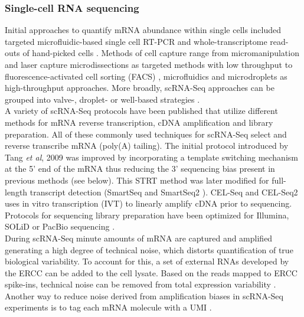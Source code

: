 \subsubsection{Single-cell RNA sequencing}

Initial approaches to quantify mRNA abundance within single cells included targeted microfluidic-based single cell RT-PCR \citep{Warren2006} and whole-transcriptome read-outs of hand-picked cells \citep{Tang2009}. Methods of cell capture range from micromanipulation \citep{Grindberg2014} and laser capture microdissections \citep{Frumkin2008} as targeted methods with low throughput to  fluorescence-activated cell sorting (FACS) \citep{Hayashi2010, Dalerba2011, Jaitin2014}, microfluidics \citep{Trapnell2014, Treutlein2014} and microdroplets \citep{Klein2015, Macosko2015} as high-throughput approaches. More broadly, \gls{scRNA-Seq} approaches can be grouped into valve-, droplet- or well-based strategies \citep{Prakadan2017}. \\

A variety of scRNA-Seq protocols have been published that utilize different methods for mRNA reverse transcription, cDNA amplification and library preparation. All of these commonly used techniques for scRNA-Seq select and reverse transcribe mRNA (poly(A) tailing). The initial protocol introduced by Tang \textit{et al}, 2009 \citep{Tang2009} was improved by incorporating a template switching mechanism at the 5' end of the mRNA thus reducing the 3' sequencing bias present in previous methods \citep{Islam2011} (see below). This \gls{STRT} method was later modified for full-length transcript detection (SmartSeq \citep{Ramskold2012} and SmartSeq2 \citep{Picelli2013}). CEL-Seq \citep{Hashimshony2012} and CEL-Seq2 \citep{Hashimshony2016} uses in vitro transcription (IVT) to linearly amplify cDNA prior to sequencing. Protocols for sequencing library preparation have been optimized for Illumina, SOLiD or PacBio sequencing \citep{Kolodziejczyk2015review}. \\

During scRNA-Seq minute amounts of mRNA are captured and amplified generating a high degree of technical noise, which distorts quantification of true biological variability. To account for this, a set of external RNAs developed by the \gls{ERCC} \citep{Rna2005} can be added to the cell lysate. Based on the reads mapped to ERCC spike-ins, technical noise can be removed from total expression variability \citep{Brennecke2013, Vallejos2015BASiCS}. Another way to reduce noise derived from amplification biases in scRNA-Seq experiments is to tag each mRNA molecule with a \gls{UMI} \citep{Kivioja2011, Islam2014}.\\

